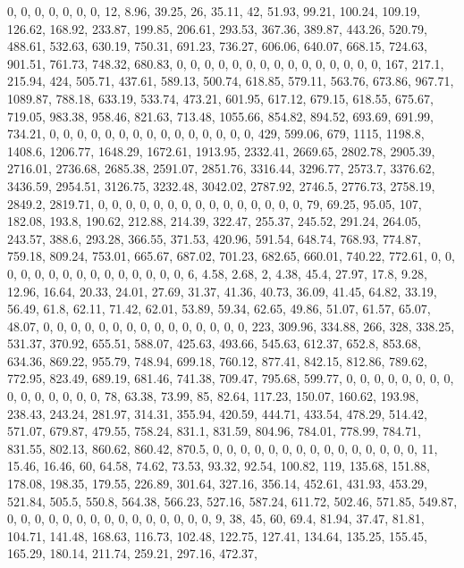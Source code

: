 \documentclass[
]{article}
\begin{document}
0, 0, 0, 0, 0, 0, 0, 12, 8.96, 39.25, 26, 35.11, 42, 51.93, 99.21,
100.24, 109.19, 126.62, 168.92, 233.87, 199.85, 206.61, 293.53, 367.36,
389.87, 443.26, 520.79, 488.61, 532.63, 630.19, 750.31, 691.23, 736.27,
606.06, 640.07, 668.15, 724.63, 901.51, 761.73, 748.32, 680.83, 0, 0, 0,
0, 0, 0, 0, 0, 0, 0, 0, 0, 0, 0, 0, 167, 217.1, 215.94, 424, 505.71,
437.61, 589.13, 500.74, 618.85, 579.11, 563.76, 673.86, 967.71, 1089.87,
788.18, 633.19, 533.74, 473.21, 601.95, 617.12, 679.15, 618.55, 675.67,
719.05, 983.38, 958.46, 821.63, 713.48, 1055.66, 854.82, 894.52, 693.69,
691.99, 734.21, 0, 0, 0, 0, 0, 0, 0, 0, 0, 0, 0, 0, 0, 0, 0, 429,
599.06, 679, 1115, 1198.8, 1408.6, 1206.77, 1648.29, 1672.61, 1913.95,
2332.41, 2669.65, 2802.78, 2905.39, 2716.01, 2736.68, 2685.38, 2591.07,
2851.76, 3316.44, 3296.77, 2573.7, 3376.62, 3436.59, 2954.51, 3126.75,
3232.48, 3042.02, 2787.92, 2746.5, 2776.73, 2758.19, 2849.2, 2819.71, 0,
0, 0, 0, 0, 0, 0, 0, 0, 0, 0, 0, 0, 0, 0, 79, 69.25, 95.05, 107, 182.08,
193.8, 190.62, 212.88, 214.39, 322.47, 255.37, 245.52, 291.24, 264.05,
243.57, 388.6, 293.28, 366.55, 371.53, 420.96, 591.54, 648.74, 768.93,
774.87, 759.18, 809.24, 753.01, 665.67, 687.02, 701.23, 682.65, 660.01,
740.22, 772.61, 0, 0, 0, 0, 0, 0, 0, 0, 0, 0, 0, 0, 0, 0, 0, 6, 4.58,
2.68, 2, 4.38, 45.4, 27.97, 17.8, 9.28, 12.96, 16.64, 20.33, 24.01,
27.69, 31.37, 41.36, 40.73, 36.09, 41.45, 64.82, 33.19, 56.49, 61.8,
62.11, 71.42, 62.01, 53.89, 59.34, 62.65, 49.86, 51.07, 61.57, 65.07,
48.07, 0, 0, 0, 0, 0, 0, 0, 0, 0, 0, 0, 0, 0, 0, 0, 223, 309.96, 334.88,
266, 328, 338.25, 531.37, 370.92, 655.51, 588.07, 425.63, 493.66,
545.63, 612.37, 652.8, 853.68, 634.36, 869.22, 955.79, 748.94, 699.18,
760.12, 877.41, 842.15, 812.86, 789.62, 772.95, 823.49, 689.19, 681.46,
741.38, 709.47, 795.68, 599.77, 0, 0, 0, 0, 0, 0, 0, 0, 0, 0, 0, 0, 0,
0, 0, 78, 63.38, 73.99, 85, 82.64, 117.23, 150.07, 160.62, 193.98,
238.43, 243.24, 281.97, 314.31, 355.94, 420.59, 444.71, 433.54, 478.29,
514.42, 571.07, 679.87, 479.55, 758.24, 831.1, 831.59, 804.96, 784.01,
778.99, 784.71, 831.55, 802.13, 860.62, 860.42, 870.5, 0, 0, 0, 0, 0, 0,
0, 0, 0, 0, 0, 0, 0, 0, 0, 11, 15.46, 16.46, 60, 64.58, 74.62, 73.53,
93.32, 92.54, 100.82, 119, 135.68, 151.88, 178.08, 198.35, 179.55,
226.89, 301.64, 327.16, 356.14, 452.61, 431.93, 453.29, 521.84, 505.5,
550.8, 564.38, 566.23, 527.16, 587.24, 611.72, 502.46, 571.85, 549.87,
0, 0, 0, 0, 0, 0, 0, 0, 0, 0, 0, 0, 0, 0, 0, 9, 38, 45, 60, 69.4, 81.94,
37.47, 81.81, 104.71, 141.48, 168.63, 116.73, 102.48, 122.75, 127.41,
134.64, 135.25, 155.45, 165.29, 180.14, 211.74, 259.21, 297.16, 472.37,
\end{document}

